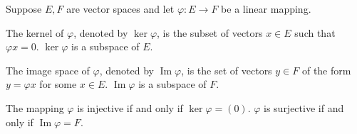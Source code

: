 Suppose $E, F$ are vector spaces and let $\varphi: E \to F$ be a linear mapping.

The kernel of $\varphi$, denoted by $\ker \varphi$, is the subset of vectors $x \in E$ such that $\varphi x = 0$. $\ker \varphi$ is a subspace of $E$.

The image space of $\varphi$, denoted by $\operatorname{Im} \varphi$, is the set of vectors $y \in F$ of the form $y = \varphi x$ for some $x \in E$. $\operatorname{Im} \varphi$ is a subspace of $F$.

The mapping $\varphi$ is injective if and only if $\ker \varphi = (0)$. $\varphi$ is surjective if and only if $\operatorname{Im} \varphi = F$.
